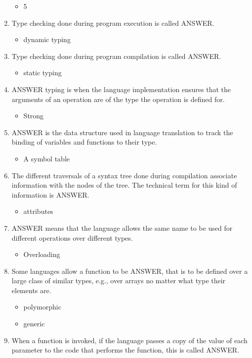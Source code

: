 \documentclass{exam}
\begin{document}
\begin{enumerate}
\begin{itemize}
\item 5
\end{itemize}
\item Type checking done during program execution is called ANSWER.
\begin{itemize}
\item dynamic typing
\end{itemize}
\item Type checking done during program compilation is called ANSWER.
\begin{itemize}
\item static typing
\end{itemize}
\item ANSWER typing is when the language implementation ensures that the arguments of an operation are of the type the operation is defined for.
\begin{itemize}
\item Strong
\end{itemize}
\item ANSWER is the data structure used in language translation to track the binding of variables and functions to their type.
\begin{itemize}
\item A symbol table
\end{itemize}
\item The different traversals of a syntax tree done during compilation associate information with the nodes of the tree.  The technical term for this kind of information is ANSWER.
\begin{itemize}
\item attributes
\end{itemize}
\item ANSWER means that the language allows the same name to be used for different operations over different types.
\begin{itemize}
\item Overloading
\end{itemize}
\item Some languages allow a function to be ANSWER, that is to be defined over a large class of similar types, e.g., over arrays no matter what type their elements are.
\begin{itemize}
\item polymorphic
\item generic
\end{itemize}
\item When a function is invoked, if the language passes a copy of the value of each parameter to the code that performs the function, this is called ANSWER.

\end{enumerate}
\end{document}
